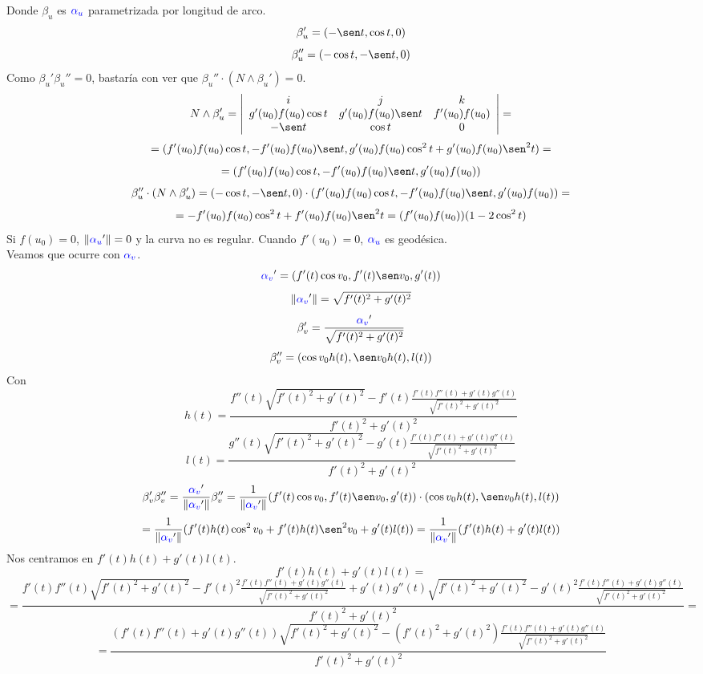 \documentclass{article}
\begin{document}
Donde $\beta_u$ es $\textcolor{blue}{\alpha_u}$ parametrizada por longitud de arco.
$$
\beta_u' = (-\sen t, \cos t, 0)
$$
$$
\beta_u'' = (-\cos t, -\sen t, 0)
$$
Como $\beta_u'\beta_u'' = 0$, bastaría con ver que $\beta_u''\cdot (N \land \beta_u') = 0$.
$$
N \land \beta_u' =
\left|\begin{array}{ccc}
    i & j & k \\
    g'(u_0)f(u_0) \cos t & g'(u_0)f(u_0)\sen t & f'(u_0)f(u_0) \\
    -\sen t & \cos t & 0 
\end{array}\right| =
$$
$$
= ( f'(u_0)f(u_0)\cos t , -f'(u_0)f(u_0)\sen t , g'(u_0)f(u_0) \cos^2 t + g'(u_0)f(u_0)\sen^2 t ) =
$$
$$
= ( f'(u_0)f(u_0)\cos t , -f'(u_0)f(u_0)\sen t , g'(u_0)f(u_0) )
$$
$$
\beta_u''\cdot (N \land \beta_u') =
(-\cos t, -\sen t, 0) \cdot ( f'(u_0)f(u_0)\cos t , -f'(u_0)f(u_0)\sen t , g'(u_0)f(u_0) ) =
$$
$$
= -f'(u_0)f(u_0)\cos^2 t + f'(u_0)f(u_0)\sen^2 t = (f'(u_0)f(u_0))(1-2\cos^2 t)
$$
Si $f(u_0) = 0$, $\| \textcolor{blue}{\alpha_u}'\| = 0$ y la curva no es regular. Cuando $f'(u_0)=0$, $\textcolor{blue}{\alpha_u}$ es geodésica.\\
Veamos que ocurre con $\textcolor{blue}{\alpha_v}$.
$$
\textcolor{blue}{\alpha_v}' = (f'(t)\cos v_0, f'(t) \sen v_0, g'(t))
$$
$$
\| \textcolor{blue}{\alpha_v}' \| = \sqrt{f'(t)^2 + g'(t)^2}
$$
$$
\beta_v ' = \frac{ \textcolor{blue}{\alpha_v}' }{\sqrt{f'(t)^2 + g'(t)^2}}
$$
$$
\beta_v '' = ( \cos v_0 h(t), \sen v_0 h(t), l(t) )
$$
Con
$$
h(t) = \frac{f''(t) \sqrt{f'(t)^2 + g'(t)^2} - f'(t) \frac{f'(t)f''(t) + g'(t)g''(t)}{\sqrt{f'(t)^2 + g'(t)^2}}}{f'(t)^2 + g'(t)^2}
$$
$$
l(t) = \frac{g''(t) \sqrt{f'(t)^2 + g'(t)^2} - g'(t) \frac{f'(t)f''(t) + g'(t)g''(t)}{\sqrt{f'(t)^2 + g'(t)^2}}}{f'(t)^2 + g'(t)^2}
$$
$$
\beta'_v\beta''_v = \frac{ \textcolor{blue}{\alpha_v}' }{\| \textcolor{blue}{\alpha_v}' \|}\beta''_v =
\frac{ 1}{\| \textcolor{blue}{\alpha_v}' \|} (f'(t)\cos v_0, f'(t) \sen v_0, g'(t)) \cdot ( \cos v_0 h(t), \sen v_0 h(t), l(t) )
$$
$$
= \frac{ 1}{\| \textcolor{blue}{\alpha_v}' \|}(f'(t)h(t)\cos^2 v_0 + f'(t)h(t)\sen^2 v_0 + g'(t)l(t)) = \frac{ 1}{\| \textcolor{blue}{\alpha_v}' \|}( f'(t)h(t) + g'(t)l(t) )
$$
Nos centramos en $f'(t)h(t) + g'(t)l(t)$.
$$
f'(t)h(t) + g'(t)l(t) =
$$
$$
= \frac{
    f'(t)f''(t) \sqrt{f'(t)^2 + g'(t)^2} - f'(t)^2 \frac{f'(t)f''(t) + g'(t)g''(t)}{\sqrt{f'(t)^2 + g'(t)^2}} +
    g'(t)g''(t) \sqrt{f'(t)^2 + g'(t)^2} - g'(t)^2 \frac{f'(t)f''(t) + g'(t)g''(t)}{\sqrt{f'(t)^2 + g'(t)^2}}}{f'(t)^2 + g'(t)^2}=
$$
$$
= \frac{
    (f'(t)f''(t) + g'(t)g''(t)) \sqrt{f'(t)^2 + g'(t)^2} - (f'(t)^2 + g'(t)^2) \frac{f'(t)f''(t) + g'(t)g''(t)}{\sqrt{f'(t)^2 + g'(t)^2}}}{f'(t)^2 + g'(t)^2}
$$
\end{document}
